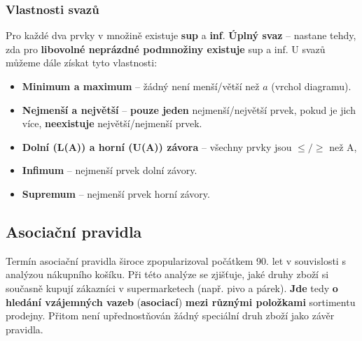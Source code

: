 \subsubsection{Vlastnosti svazů}
Pro každé dva prvky v množině existuje \textbf{sup} a \textbf{inf}. \textbf{Úplný svaz} -- nastane tehdy, zda pro \textbf{libovolné neprázdné podmnožiny existuje} sup a inf. U svazů můžeme dále získat tyto vlastnosti:
\begin{itemize}
\item \textbf{Minimum a maximum} -- žádný není menší/větší než $a$ (vrchol diagramu).
\item \textbf{Nejmenší a největší} -- \textbf{pouze jeden} nejmenší/největší prvek, pokud je jich více, \textbf{neexistuje} největší/nejmenší prvek.
\item \textbf{Dolní (L(A)) a horní (U(A)) závora} -- všechny prvky jsou $\leq/\geq$ než A,
\item \textbf{Infimum} -- nejmenší prvek dolní závory.
\item \textbf{Supremum} -- nejmenší prvek horní závory.
\end{itemize}

\subsection{Asociační pravidla}
Termín asociační pravidla široce zpopularizoval počátkem 90. let v souvislosti s analýzou nákupního košíku. Při této analýze se zjišťuje, jaké druhy zboží si současně kupují zákazníci v supermarketech (např. pivo a párek). \textbf{Jde} tedy \textbf{o hledání vzájemných vazeb} (\textbf{asociací}) \textbf{mezi různými položkami} sortimentu prodejny. Přitom není upřednostňován žádný speciální druh zboží jako závěr pravidla.

